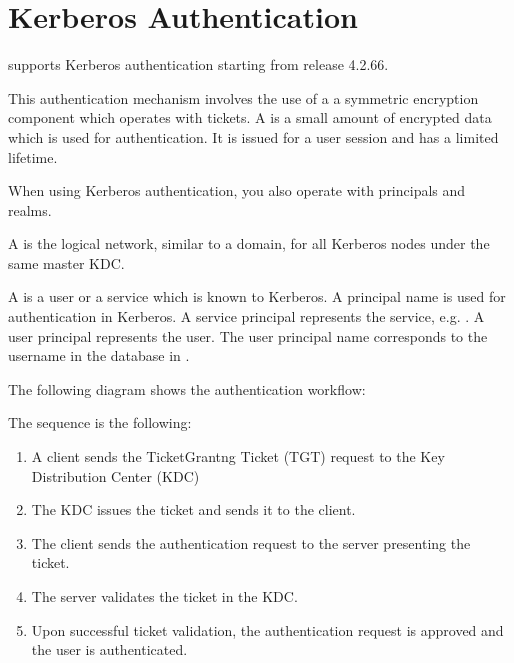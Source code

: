 \documentclass[letterpaper,10pt,english]{sphinxmanual}
\begin{document}
\section{Kerberos Authentication}
\label{\detokenize{authentication:kerberos-authentication}}\label{\detokenize{authentication:id2}}
\sphinxAtStartPar
{} supports Kerberos authentication starting from release 4.2.6\sphinxhyphen{}6.

\sphinxAtStartPar
This authentication mechanism involves the use of a  \sphinxhyphen{} a symmetric encryption component which operates with tickets. A  is a small amount of encrypted data which is used for authentication. It is issued for a user session and has a limited lifetime.

\sphinxAtStartPar
When using Kerberos authentication, you also operate with principals and realms.

\sphinxAtStartPar
A  is the logical network, similar to a domain, for all Kerberos nodes under the same master KDC.

\sphinxAtStartPar
A  is a user or a service which is known to Kerberos. A principal name is used for authentication in Kerberos. A service principal represents the service, e.g. . A user principal represents the user. The user principal name corresponds to the username in the  database in .

\sphinxAtStartPar
The following diagram shows the authentication workflow:

\noindent{}

\sphinxAtStartPar
The sequence is the following:
\begin{enumerate}
%
\item {} 
\sphinxAtStartPar
A  client sends the Ticket\sphinxhyphen{}Grantng Ticket (TGT) request to the Key Distribution Center (KDC)

\item {} 
\sphinxAtStartPar
The KDC issues the ticket and sends it to the  client.

\item {} 
\sphinxAtStartPar
The  client sends the authentication request to the  server presenting the ticket.

\item {} 
\sphinxAtStartPar
The  server validates the ticket in the KDC.

\item {} 
\sphinxAtStartPar
Upon successful ticket validation, the authentication request is approved and the user is authenticated.

\end{enumerate}
\end{document}
